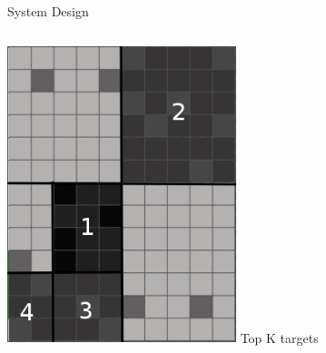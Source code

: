 \documentclass[9pt]{beamer}
\begin{document}
\begin{frame}{System Design}
\begin{columns}
\begin{column}{0.33\textwidth}
                \includegraphics[width=0.50\textwidth,trim={0cm 0cm 0cm 0cm},clip]{img/analyst_grid_targets.png}
                \newline
                Top K targets
        \end{column}
    \end{columns}
\end{frame}
\end{document}
